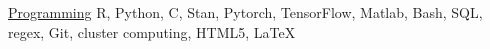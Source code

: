 

\begin{cvskills}

  \cvskill
    {\href{https://github.com/sw1}{Programming}} %
    {R, Python, C, Stan, Pytorch, TensorFlow, Matlab, Bash, SQL, regex, Git, cluster computing, HTML5, \LaTeX} %

\end{cvskills}
